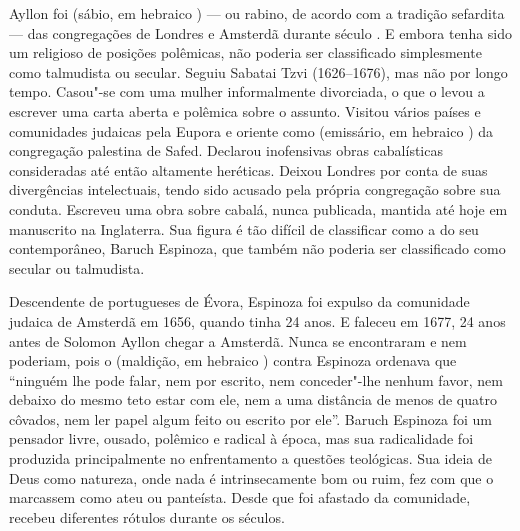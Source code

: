\begin{multicols}{2}
\baselineskip
\lineskip=1pt
\noindent{}Ayllon foi {} (sábio, em hebraico {}) --- ou rabino, de acordo com a tradição sefardita --- das congregações de Londres e Amsterdã durante século . E embora tenha sido um religioso de posições polêmicas, não poderia ser classificado simplesmente como talmudista ou secular. Seguiu Sabatai Tzvi (1626--1676), mas não por longo tempo. Casou"-se com uma mulher informalmente divorciada, o que o levou a escrever uma carta aberta e polêmica sobre o assunto. Visitou vários países e comunidades judaicas pela Eupora e oriente como {} (emissário, em hebraico {}) da congregação palestina de Safed. Declarou inofensivas obras cabalísticas consideradas até então altamente heréticas. Deixou Londres por conta de suas divergências intelectuais, tendo sido acusado pela própria congregação sobre sua conduta. Escreveu uma obra sobre cabalá, nunca publicada, mantida até hoje em manuscrito na Inglaterra. Sua figura é tão difícil de classificar como a do seu contemporâneo, Baruch Espinoza, que também não poderia ser classificado como secular ou talmudista.

\vspace{\baselineskip}

{\small{}}

\vspace{\baselineskip}

Descendente de portugueses de Évora, Espinoza foi expulso da comunidade judaica de Amsterdã em 1656, quando tinha 24 anos. E faleceu em 1677, 24 anos antes de Solomon Ayllon chegar a Amsterdã. Nunca se encontraram e nem poderiam, pois o {} (maldição, em hebraico {}) contra Espinoza ordenava que ``ninguém lhe pode falar, nem por escrito, nem conceder"-lhe nenhum favor, nem debaixo do mesmo teto estar com ele, nem a uma distância de menos de quatro côvados, nem ler papel algum feito ou escrito por ele''. Baruch Espinoza foi um pensador livre, ousado, polêmico e radical à época, mas sua radicalidade foi produzida principalmente no enfrentamento a questões teológicas. Sua ideia de Deus como natureza, onde nada é intrinsecamente bom ou ruim, fez com que o marcassem como ateu ou panteísta. Desde que foi afastado da comunidade, recebeu diferentes rótulos durante os séculos.


\end{multicols}
